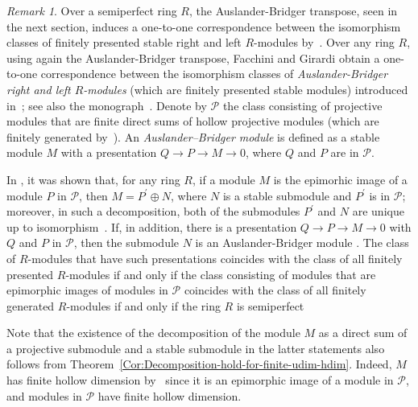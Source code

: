 \documentclass[11pt,a4paper]{amsart}
\theoremstyle{plain}
\theoremstyle{definition}
\theoremstyle{remark}
\newtheorem{remark}[theorem]{Remark}
\begin{document}
\begin{remark}
Over a semiperfect ring $ R $, the Auslander-Bridger transpose, seen in the next section, induces a one-to-one correspondence between the isomorphism classes of finitely
presented stable right  and  left $R$-modules  by~\cite[Theorem 2.4]{Warfield:SerialRingsAndFinitelyPresentedModules}. Over any ring $R$, using again the Auslander-Bridger transpose, Facchini and Girardi obtain a one-to-one correspondence between the isomorphism classes of \emph{Auslander-Bridger right and left $ R $-modules} (which are finitely presented stable modules) introduced  in~\cite{Facchini-Girardi:AuslanderBridgerModules}; see also the monograph~\cite[Chapter 6]{Facchini:SemilocalCategoriesAndModulesWithSemilocalEndomorphism}. Denote by $\mathcal{P}$ the class consisting of projective modules that are finite direct sums of hollow projective modules (which are finitely generated by~\cite[Lemma 2.1]{Facchini-Girardi:AuslanderBridgerModules}). An \emph{Auslander–Bridger module} is defined as a stable module $M$ with a presentation $Q \rightarrow P \rightarrow M \rightarrow 0$, where $Q$ and $P$ are in $\mathcal{P}$.

In \cite{Facchini-Girardi:AuslanderBridgerModules}, it was shown that, for any ring $ R $, if a module $M$ is the epimorhic image of a module $P$ in $\mathcal{P}$, then $M=P^{\prime} \oplus N$, where $N$ is a stable submodule and $P^{\prime}$ is in $\mathcal{P}$; moreover, in such a decomposition, both of the submodules $P^{\prime}$ and $N$ are unique up to isomorphism~\cite[Proposition 3.5]{Facchini-Girardi:AuslanderBridgerModules}. If, in addition, there is a presentation $Q \rightarrow P \rightarrow M \rightarrow 0$ with $Q$ and $P$ in $\mathcal{P}$, then the submodule $N$ is an Auslander-Bridger module \cite[Corollary 3.8]{Facchini-Girardi:AuslanderBridgerModules}. The class of $R$-modules that have such presentations coincides with the class of all finitely presented $ R $-modules if and only if the class consisting of modules that are epimorphic images of modules in $\mathcal{P}$ coincides with the class of all finitely generated $ R $-modules if and only if the ring $ R $ is semiperfect~\cite[Lemma 6.7]{Facchini:SemilocalCategoriesAndModulesWithSemilocalEndomorphism}

Note that the existence of the decomposition of the module $M$ as a direct sum of a projective submodule and a stable submodule in the latter statements also follows from Theorem~\ref{Cor:Decomposition-hold-for-finite-udim-hdim}.
Indeed, $M$ has finite hollow dimension by~\cite[Proposition 2.42]{Facchini:ModuleTheory} since it is an epimorphic image of a module in $\mathcal{P}$, and modules in $\mathcal{P}$ have finite hollow dimension.
\end{remark}
\end{document}
